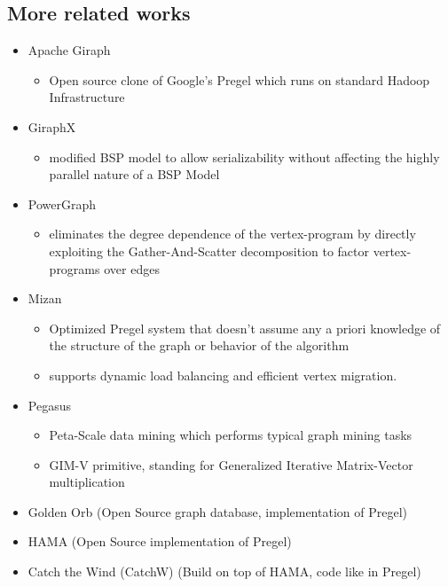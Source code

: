 \subsection{More related works}
\begin{frame}
\begin{itemize}

  \item Apache Giraph 
    \begin{itemize}
        \item Open source clone of Google's Pregel which runs on standard Hadoop Infrastructure 
    \end{itemize}
    
  \item GiraphX 
     \begin{itemize}
        \item modified BSP model to allow serializability without affecting the highly parallel nature of a BSP Model
     \end{itemize} 
     
     \item PowerGraph 
     \begin{itemize}
    	\item eliminates the degree dependence of the vertex-program by directly exploiting the Gather-And-Scatter decomposition to factor vertex-programs over edges
     \end{itemize} 
     
  \item Mizan 
  	\begin{itemize}
        \item Optimized Pregel system  that doesn't assume any a priori knowledge of the structure of the graph or behavior of the algorithm
        \item supports  dynamic  load  balancing  and  efficient vertex migration.
     \end{itemize} 
    \end{itemize}
\end{frame}
  
  \begin{frame}
\begin{itemize}
  
  \item Pegasus
  	\begin{itemize}
	\item Peta-Scale data mining which performs typical graph mining tasks 
  	\item GIM-V primitive,  standing  for Generalized  Iterative  Matrix-Vector  multiplication
	\end{itemize}
	
  \item Golden Orb (Open Source graph database, implementation of Pregel)
  
  \item HAMA (Open Source implementation of Pregel) 
  \item Catch the Wind (CatchW) (Build on top of HAMA, code like in Pregel) 
  
  \end{itemize}
\end{frame}
